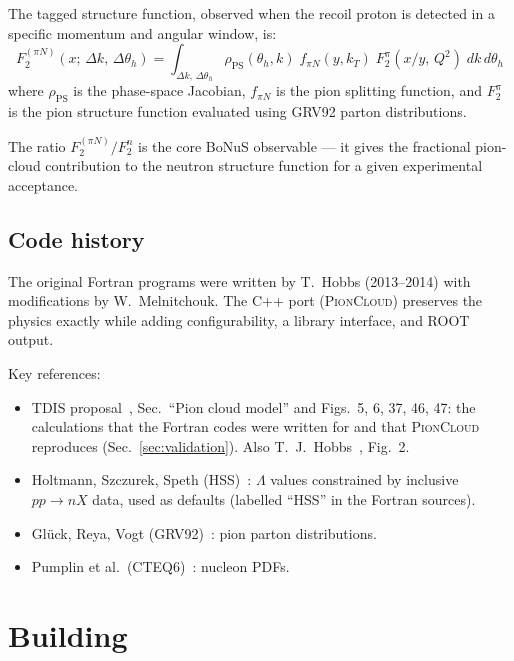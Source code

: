 \documentclass[11pt,a4paper]{article}
\newcommand{\picloud}{\textsc{PionCloud}}
\begin{document}
The tagged structure function, observed when the recoil proton is
detected in a specific momentum and angular window, is:
\begin{equation}
  F_2^{(\pi N)}(x;\,\Delta k,\,\Delta\theta_h)
  = \int_{\Delta k,\,\Delta\theta_h}
    \rho_\mathrm{PS}(\theta_h, k)\;
    f_{\pi N}(y, k_T)\;
    F_2^{\pi}(x/y,\, Q^2)\;
    dk\, d\theta_h
\end{equation}
where $\rho_\mathrm{PS}$ is the phase-space Jacobian, $f_{\pi N}$ is
the pion splitting function, and $F_2^\pi$ is the pion structure
function evaluated using GRV92 parton distributions.

The ratio $F_2^{(\pi N)} / F_2^n$ is the core BoNuS observable ---
it gives the fractional pion-cloud contribution to the neutron
structure function for a given experimental acceptance.

\subsection{Code history}

The original Fortran programs were written by T.~Hobbs (2013--2014)
with modifications by W.~Melnitchouk.  The C++ port
(\picloud{}) preserves the physics exactly while adding configurability,
a library interface, and ROOT output.

Key references:
\begin{itemize}
\item TDIS proposal~\cite{TDIS15}, Sec.~``Pion cloud model'' and
  Figs.~5, 6, 37, 46, 47: the calculations that the Fortran codes were
  written for and that \picloud{} reproduces (Sec.~\ref{sec:validation}).
  Also T.~J.~Hobbs~\cite{Hobbs15}, Fig.~2.
\item Holtmann, Szczurek, Speth (HSS)~\cite{HSS96}: $\Lambda$ values
  constrained by inclusive $pp\to nX$ data, used as defaults
  (labelled ``HSS'' in the Fortran sources).
\item Gl\"{u}ck, Reya, Vogt (GRV92)~\cite{GRV92}: pion parton distributions.
\item Pumplin et al.\ (CTEQ6)~\cite{CTEQ6}: nucleon PDFs.
\end{itemize}

\section{Building}
\end{document}
